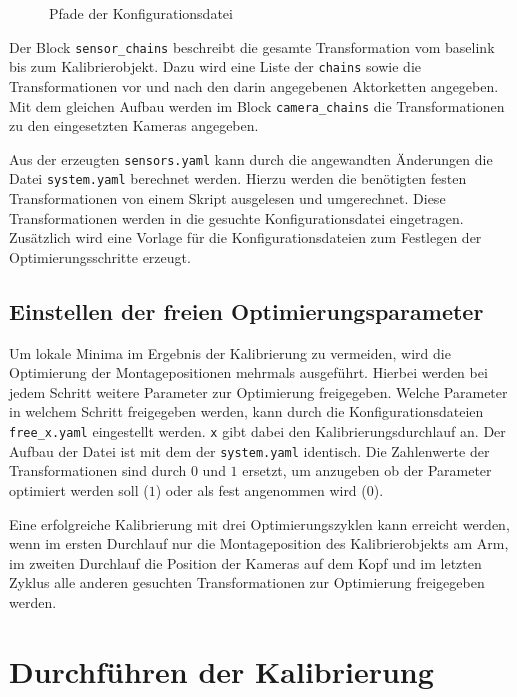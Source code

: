 \begin{figure}[htpb]
  \centering
  \def\svgwidth{.5\textwidth}
  
  \caption{Pfade der Konfigurationsdatei}
  \label{fig:ketten}
\end{figure}

Der Block \texttt{sensor\_chains} beschreibt die gesamte Transformation vom \ac{baselink}
bis zum Kalibrierobjekt. Dazu wird eine Liste der \texttt{chains} sowie die
Transformationen vor und nach den darin angegebenen Aktorketten angegeben.
Mit dem gleichen Aufbau werden im Block \texttt{camera\_chains} die Transformationen zu den 
eingesetzten Kameras angegeben.

Aus der erzeugten \texttt{sensors.yaml} kann durch die angewandten Änderungen
die Datei \texttt{system.yaml} berechnet werden. Hierzu werden die benötigten
festen Transformationen von einem Skript ausgelesen und umgerechnet. Diese
Transformationen werden in die gesuchte Konfigurationsdatei eingetragen.
Zusätzlich wird eine Vorlage für die Konfigurationsdateien zum Festlegen
der Optimierungsschritte erzeugt.

\subsection{Einstellen der freien Optimierungsparameter}
\label{sub:Einstellen der freien Optimierungsparameter}

Um lokale Minima im Ergebnis der Kalibrierung zu vermeiden, wird die Optimierung
der Montagepositionen mehrmals ausgeführt. Hierbei werden bei jedem Schritt 
weitere Parameter zur Optimierung freigegeben. Welche Parameter in welchem 
Schritt freigegeben werden, kann durch die Konfigurationsdateien
\texttt{free\_x.yaml} eingestellt werden. \texttt{x} gibt dabei den Kalibrierungsdurchlauf an.
Der Aufbau der Datei ist mit dem der \texttt{system.yaml} identisch. Die
Zahlenwerte der Transformationen sind durch $0$ und $1$ ersetzt, um anzugeben ob
der Parameter optimiert werden soll ($1$) oder als fest angenommen wird ($0$).

Eine erfolgreiche Kalibrierung mit drei Optimierungszyklen kann erreicht 
werden, wenn im ersten Durchlauf nur die Montageposition des Kalibrierobjekts 
am Arm, im zweiten Durchlauf die Position der Kameras auf dem Kopf und im letzten 
Zyklus alle anderen gesuchten Transformationen zur Optimierung freigegeben 
werden.


\section{Durchführen der Kalibrierung}
\label{sec:Durchführen der Kalibrierung}

